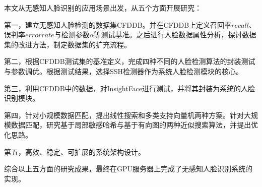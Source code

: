 
\begin{summary}

本文从无感知人脸识别的应用场景出发，从五个方面开展研究：

第一，建立无感知人脸检测的数据集CFDDB。并在CFDDB上定义召回率$recall$、误判率$errorrate$与检测参数$\alpha$等测试基准。之后进行人脸数据属性分析，探讨数据集的改进方法，制定数据集的扩充流程。

第二，根据CFDDB测试集的基准定义，完成四种不同的人脸检测算法的封装测试与参数调优。根据测试结果，选择SSH检测器\cite{najibi2017ssh}作为系统人脸检测模块的核心。

第三，利用CFDDB中的数据，对InsightFace\cite{deng2018arcface}进行测试，并将其封装为系统的人脸识别模块。

第四，针对小规模数据匹配，提出线性搜索和多类支持向量机两种方案。针对大规模数据匹配，研究基于局部敏感哈希与基于有向图的两种近似搜索算法，并提出优化思路。

第五，高效、稳定、可扩展的系统架构设计。

综合以上五方面的研究成果，最终在GPU服务器上完成了无感知人脸识别系统的实现。

\end{summary}
